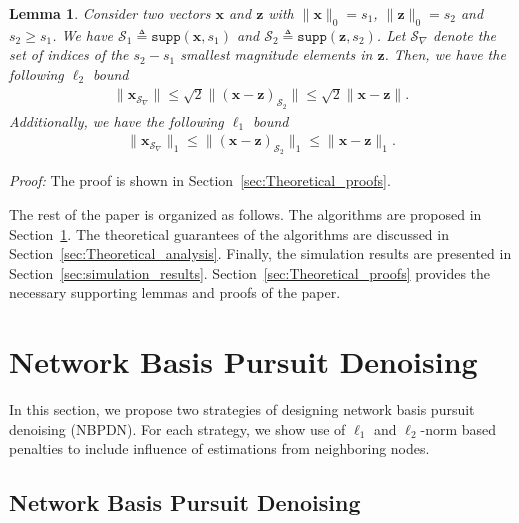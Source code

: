 \documentclass[journal]{IEEEtran}
\newcommand{\mbx}{\mathbf{x}}
\newcommand{\supp}{\ensuremath{\texttt{supp}}}
\newtheorem{lemma}{Lemma}
\begin{document}
\begin{lemma}{\label{lem:smaller_indices_bound_l1_l2}}
Consider two vectors $\mbx$ and ${\mathbf{z}}$ with $\|\mbx\|_{0} = s_1$, $\|{\mathbf{z}}\|_{0} = s_2$ and $s_2 \geq s_1$. We have $\mathcal{S}_1 \triangleq \supp(\mbx, s_1)$ and $\mathcal{S}_2 \triangleq \supp({\mathbf{z}},s_2)$. Let $\mathcal{S}_{\nabla}$ denote the set of indices of the $s_2-s_1$ smallest magnitude elements in ${\mathbf{z}}$. Then, we have the following $\ell_2$ bound
\begin{eqnarray*}
\|\mbx_{\mathcal{S}_{\nabla}}\|  \leq \sqrt{2} \|(\mbx-{\mathbf{z}})_{\mathcal{S}_2}\| \leq \sqrt{2} \|\mbx-{\mathbf{z}}\|.
\end{eqnarray*}
Additionally, we have the following $\ell_1$ bound
\begin{eqnarray*}
\|\mbx_{\mathcal{S}_{\nabla}}\|_1  \leq  \|(\mbx-{\mathbf{z}})_{\mathcal{S}_2}\|_1 \leq \|\mbx-{\mathbf{z}}\|_1.
\end{eqnarray*}
\end{lemma}
\noindent \emph{Proof:} The proof is shown in Section~\ref{sec:Theoretical_proofs}.





The rest of the paper is organized as follows. The algorithms are proposed in Section~\ref{sec:DBP_algorithm}. The theoretical guarantees of the algorithms are discussed in Section~\ref{sec:Theoretical_analysis}. Finally, the simulation results are presented in Section~\ref{sec:simulation_results}. Section~\ref{sec:Theoretical_proofs} provides the necessary supporting lemmas and proofs of the paper.




\section{Network Basis Pursuit Denoising}
\label{sec:DBP_algorithm}
In this section, we propose two strategies of designing network basis pursuit denoising (NBPDN). For each strategy, we show use of $\ell_1$ and $\ell_2$-norm based penalties to include influence of estimations from neighboring nodes. 

\subsection{Network Basis Pursuit Denoising}
\label{subsec:NBPDN}
\end{document}
